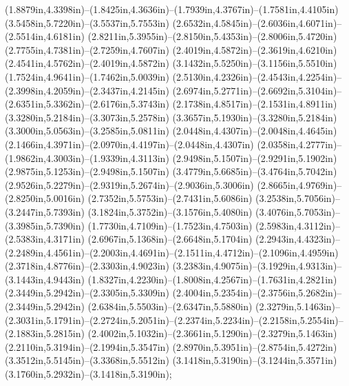 (1.8879in,4.3398in)--(1.8425in,4.3636in)--(1.7939in,4.3767in)--(1.7581in,4.4105in) (3.5458in,5.7220in)--(3.5537in,5.7553in) (2.6532in,4.5845in)--(2.6036in,4.6071in)--(2.5514in,4.6181in) (2.8211in,5.3955in)--(2.8150in,5.4353in)--(2.8006in,5.4720in) (2.7755in,4.7381in)--(2.7259in,4.7607in) (2.4019in,4.5872in)--(2.3619in,4.6210in) (2.4541in,4.5762in)--(2.4019in,4.5872in) (3.1432in,5.5250in)--(3.1156in,5.5510in) (1.7524in,4.9641in)--(1.7462in,5.0039in) (2.5130in,4.2326in)--(2.4543in,4.2254in)--(2.3998in,4.2059in)--(2.3437in,4.2145in) (2.6974in,5.2771in)--(2.6692in,5.3104in)--(2.6351in,5.3362in)--(2.6176in,5.3743in) (2.1738in,4.8517in)--(2.1531in,4.8911in) (3.3280in,5.2184in)--(3.3073in,5.2578in) (3.3657in,5.1930in)--(3.3280in,5.2184in) (3.3000in,5.0563in)--(3.2585in,5.0811in) (2.0448in,4.4307in)--(2.0048in,4.4645in) (2.1466in,4.3971in)--(2.0970in,4.4197in)--(2.0448in,4.4307in) (2.0358in,4.2777in)--(1.9862in,4.3003in)--(1.9339in,4.3113in) (2.9498in,5.1507in)--(2.9291in,5.1902in) (2.9875in,5.1253in)--(2.9498in,5.1507in) (3.4779in,5.6685in)--(3.4764in,5.7042in) (2.9526in,5.2279in)--(2.9319in,5.2674in)--(2.9036in,5.3006in) (2.8665in,4.9769in)--(2.8250in,5.0016in) (2.7352in,5.5753in)--(2.7431in,5.6086in) (3.2538in,5.7056in)--(3.2447in,5.7393in) (3.1824in,5.3752in)--(3.1576in,5.4080in) (3.4076in,5.7053in)--(3.3985in,5.7390in) (1.7730in,4.7109in)--(1.7523in,4.7503in) (2.5983in,4.3112in)--(2.5383in,4.3171in) (2.6967in,5.1368in)--(2.6648in,5.1704in) (2.2943in,4.4323in)--(2.2489in,4.4561in)--(2.2003in,4.4691in)--(2.1511in,4.4712in)--(2.1096in,4.4959in) (2.3718in,4.8776in)--(2.3303in,4.9023in) (3.2383in,4.9075in)--(3.1929in,4.9313in)--(3.1443in,4.9443in) (1.8327in,4.2230in)--(1.8008in,4.2567in)--(1.7631in,4.2821in) (2.3449in,5.2942in)--(2.3305in,5.3309in) (2.4004in,5.2354in)--(2.3756in,5.2682in)--(2.3449in,5.2942in) (2.6384in,5.5503in)--(2.6347in,5.5880in) (2.3279in,5.1463in)--(2.3031in,5.1791in)--(2.2724in,5.2051in)--(2.2374in,5.2234in)--(2.2158in,5.2554in)--(2.1883in,5.2815in) (2.4002in,5.1032in)--(2.3661in,5.1290in)--(2.3279in,5.1463in) (2.2110in,5.3194in)--(2.1994in,5.3547in) (2.8970in,5.3951in)--(2.8754in,5.4272in)
(3.3512in,5.5145in)--(3.3368in,5.5512in) (3.1418in,5.3190in)--(3.1244in,5.3571in) (3.1760in,5.2932in)--(3.1418in,5.3190in);
